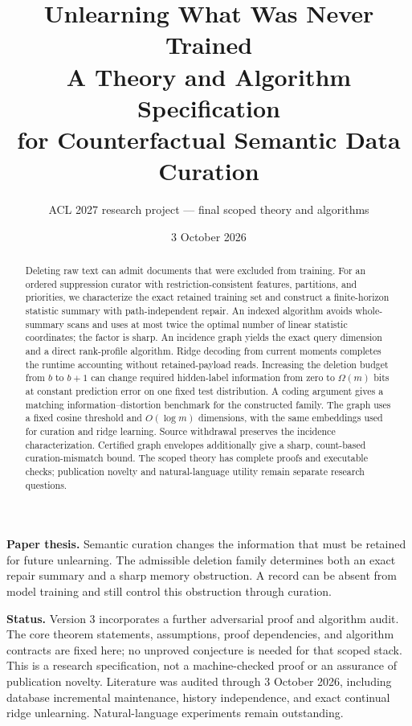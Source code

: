 \documentclass[11pt,a4paper]{article}
\title{\color{ink}\textbf{Unlearning What Was Never Trained}\\[5pt]\Large A Theory and Algorithm Specification\\for Counterfactual Semantic Data Curation}
\author{ACL 2027 research project --- final scoped theory and algorithms}
\date{3 October 2026}
\theoremstyle{definition}\newtheorem{definition}[theorem]{Definition}
\begin{document}
\maketitle
\begin{abstract}
Deleting raw text can admit documents that were excluded from training. For an ordered suppression curator with restriction-consistent features, partitions, and priorities, we characterize the exact retained training set and construct a finite-horizon statistic summary with path-independent repair. An indexed algorithm avoids whole-summary scans and uses at most twice the optimal number of linear statistic coordinates; the factor is sharp. An incidence graph yields the exact query dimension and a direct rank-profile algorithm. Ridge decoding from current moments completes the runtime accounting without retained-payload reads. Increasing the deletion budget from $b$ to $b+1$ can change required hidden-label information from zero to $\Omega(m)$ bits at constant prediction error on one fixed test distribution. A coding argument gives a matching information--distortion benchmark for the constructed family. The graph uses a fixed cosine threshold and $O(\log m)$ dimensions, with the same embeddings used for curation and ridge learning. Source withdrawal preserves the incidence characterization. Certified graph envelopes additionally give a sharp, count-based curation-mismatch bound. The scoped theory has complete proofs and executable checks; publication novelty and natural-language utility remain separate research questions.
\end{abstract}

\textbf{Paper thesis.} Semantic curation changes the information that must be retained for future unlearning. The admissible deletion family determines both an exact repair summary and a sharp memory obstruction. A record can be absent from model training and still control this obstruction through curation.

\textbf{Status.} Version 3 incorporates a further adversarial proof and algorithm audit. The core theorem statements, assumptions, proof dependencies, and algorithm contracts are fixed here; no unproved conjecture is needed for that scoped stack. This is a research specification, not a machine-checked proof or an assurance of publication novelty. Literature was audited through 3 October 2026, including database incremental maintenance, history independence, and exact continual ridge unlearning. Natural-language experiments remain outstanding.
\end{document}
